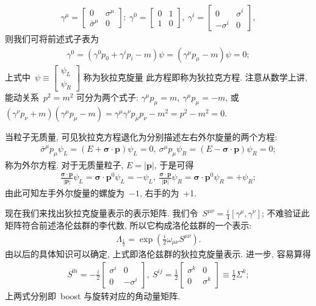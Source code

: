 \begin{align}
\gamma^\mu=
\left[\begin{array}{cc}
0&\sigma^\mu\\
\bar{\sigma}^\mu&0
\end{array}\right]:~
\gamma^0=
\left[\begin{array}{cc}
0&1\\
1&0
\end{array}\right],~
\gamma^i=
\left[\begin{array}{cc}
0&\sigma^i\\
-\sigma^i&0
\end{array}\right],
\end{align}
则我们可将前述式子表为
\begin{align}
\gamma^0=
(\gamma^0p_0+\gamma^ip_i-m)\psi=(\gamma^\mu p_\mu-m)\psi=0;
\end{align}
上式中~$\psi\equiv\left[\begin{array}{c}\psi_L\\\psi_R\end{array}\right]$ 称为狄拉克旋量 此方程即称为狄拉克方程. 注意从数学上讲, 能动关系~$p^2=m^2$ 可分为两个式子: $\gamma^\mu p_\mu=m,~\gamma^\mu p_\mu=-m$, 或~$(\gamma^\nu p_\nu+m)(\gamma^\mu p_\mu-m)=\gamma^\mu\gamma^\nu p_\mu p_\nu-m^2=p^2-m^2=0$.

当粒子无质量, 可见狄拉克方程退化为分别描述左右外尔旋量的两个方程:
\begin{align}
\bar{\sigma}^\mu p_\mu\psi_L=(E+\bm{\sigma}\cdot\bm{p})\psi_L=0,~\sigma^\mu p_\mu\psi_R=(E-\bm{\sigma}\cdot\bm{p})\psi_R=0;
\end{align}
称为外尔方程. 对于无质量粒子, $E=|\bm{p}|$, 于是可得
\begin{align}
\frac{\bm{\sigma}\cdot\bm{p}}{|\bm{p}|}\psi_L=\bm{\sigma}\cdot\bm{p}^0\psi_L=-\psi_L,~\frac{\bm{\sigma}\cdot\bm{p}}{|\bm{p}|}\psi_R=\bm{\sigma}\cdot\bm{p}^0\psi_R=+\psi_R;
\end{align}
由此可知左手外尔旋量的螺旋为~$-1$, 右手的为~+1.


现在我们来找出狄拉克旋量表示的表示矩阵. 我们令~$S^{\mu\nu}=\frac{i}{4}[\gamma^\mu,\gamma^\nu]$; 不难验证此矩阵符合前述洛伦兹群的李代数, 所以它构成洛伦兹群的一个表示:
\begin{align}
\Lambda_{\frac{1}{2}}=\exp\left(\frac{i}{2}\omega_{\mu\nu}S^{\mu\nu}\right).
\end{align}
由以后的具体知识可以确定, 上式即洛伦兹群的狄拉克旋量表示. 进一步, 容易算得
\begin{align}
S^{0i}=-\frac{i}{2}\left[\begin{array}{cc}\sigma^i&0\\0&-\sigma^i\end{array}\right],~S^{ij}=\frac{1}{2}\left[\begin{array}{cc}\sigma^k&0\\0&\sigma^k\end{array}\right]\equiv\frac{1}{2}\Sigma^k;
\end{align}
上两式分别即~boost 与旋转对应的角动量矩阵.


